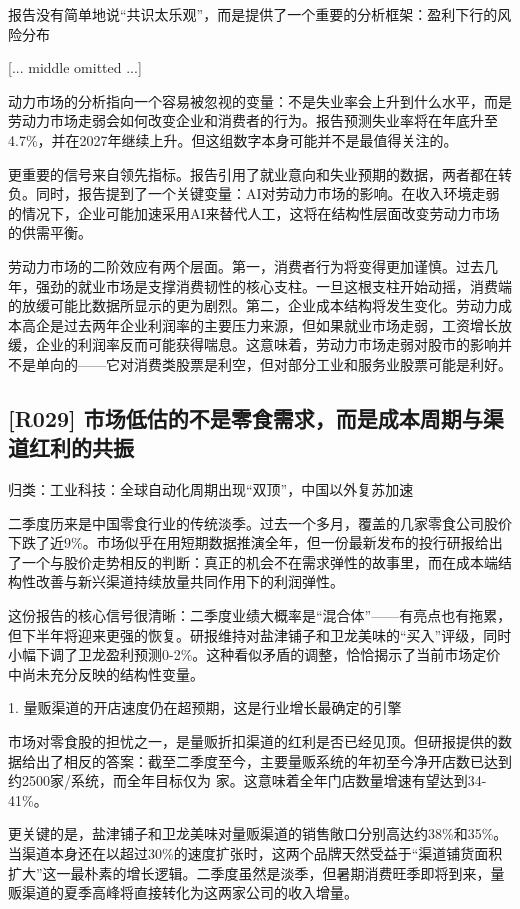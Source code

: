 \documentclass[11pt]{ctexart}
\begin{document}
报告没有简单地说“共识太乐观”，而是提供了一个重要的分析框架：盈利下行的风险分布

[... middle omitted ...]

动力市场的分析指向一个容易被忽视的变量：不是失业率会上升到什么水平，而是劳动力市场走弱会如何改变企业和消费者的行为。报告预测失业率将在年底升至4.7\%，并在2027年继续上升。但这组数字本身可能并不是最值得关注的。

更重要的信号来自领先指标。报告引用了就业意向和失业预期的数据，两者都在转负。同时，报告提到了一个关键变量：AI对劳动力市场的影响。在收入环境走弱的情况下，企业可能加速采用AI来替代人工，这将在结构性层面改变劳动力市场的供需平衡。

劳动力市场的二阶效应有两个层面。第一，消费者行为将变得更加谨慎。过去几年，强劲的就业市场是支撑消费韧性的核心支柱。一旦这根支柱开始动摇，消费端的放缓可能比数据所显示的更为剧烈。第二，企业成本结构将发生变化。劳动力成本高企是过去两年企业利润率的主要压力来源，但如果就业市场走弱，工资增长放缓，企业的利润率反而可能获得喘息。这意味着，劳动力市场走弱对股市的影响并不是单向的——它对消费类股票是利空，但对部分工业和服务业股票可能是利好。

\subsection{[R029] 市场低估的不是零食需求，而是成本周期与渠道红利的共振}
{\small\color{refgray}归类：工业科技：全球自动化周期出现“双顶”，中国以外复苏加速}

二季度历来是中国零食行业的传统淡季。过去一个多月，覆盖的几家零食公司股价下跌了近9\%。市场似乎在用短期数据推演全年，但一份最新发布的投行研报给出了一个与股价走势相反的判断：真正的机会不在需求弹性的故事里，而在成本端结构性改善与新兴渠道持续放量共同作用下的利润弹性。

这份报告的核心信号很清晰：二季度业绩大概率是“混合体”——有亮点也有拖累，但下半年将迎来更强的恢复。研报维持对盐津铺子和卫龙美味的“买入”评级，同时小幅下调了卫龙盈利预测0-2\%。这种看似矛盾的调整，恰恰揭示了当前市场定价中尚未充分反映的结构性变量。

1. 量贩渠道的开店速度仍在超预期，这是行业增长最确定的引擎

市场对零食股的担忧之一，是量贩折扣渠道的红利是否已经见顶。但研报提供的数据给出了相反的答案：截至二季度至今，主要量贩系统的年初至今净开店数已达到约2500家/系统，而全年目标仅为 家。这意味着全年门店数量增速有望达到34-41\%。

更关键的是，盐津铺子和卫龙美味对量贩渠道的销售敞口分别高达约38\%和35\%。当渠道本身还在以超过30\%的速度扩张时，这两个品牌天然受益于“渠道铺货面积扩大”这一最朴素的增长逻辑。二季度虽然是淡季，但暑期消费旺季即将到来，量贩渠道的夏季高峰将直接转化为这两家公司的收入增量。
\end{document}
